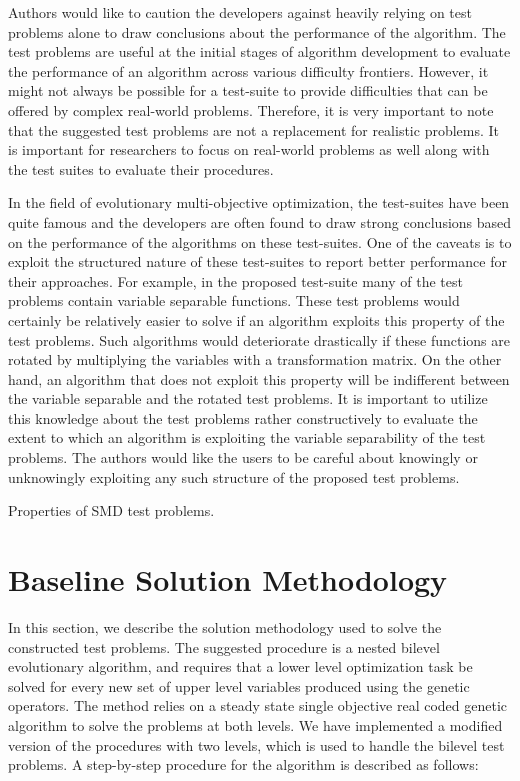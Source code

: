 \documentclass[twoside]{article}
\begin{document}
Authors would like to caution the developers against heavily relying on test problems alone to draw conclusions about the performance of the algorithm. The test problems are useful at the initial stages of algorithm development to evaluate the performance of an algorithm across various difficulty frontiers. 
However, it might not always be possible for a test-suite to provide difficulties that can be offered by complex real-world problems. Therefore, it is very important to note that the suggested test problems are not a replacement for realistic problems. It is important for researchers to focus on real-world problems as well along with the test suites to evaluate their procedures.

In the field of evolutionary multi-objective optimization, the test-suites have been quite famous and the developers are often found to draw strong conclusions based on the performance of the algorithms on these test-suites. One of the caveats is to exploit the structured nature of these test-suites to report better performance for their approaches. For example, in the proposed test-suite many of the test problems contain variable separable functions. These test problems would certainly be relatively easier to solve if an algorithm exploits this property of the test problems. Such algorithms would deteriorate drastically if these functions are rotated by multiplying the variables with a transformation matrix. On the other hand, an algorithm that does not exploit this property will be indifferent between the variable separable and the rotated test problems. It is important to utilize this knowledge about the test problems rather constructively to evaluate the extent to which an algorithm is exploiting the variable separability of the test problems. The authors would like the users to be careful about knowingly or unknowingly exploiting any such structure of the proposed test problems.

\begin{table*}[!ht]
\begin{center}
\vspace{0mm}
\caption{Properties of SMD test problems.} 
\label{tab:summary}
\vspace{0mm}
\end{center}
\end{table*}

\section{Baseline Solution Methodology}\label{sec:nested-algorithm}
In this section, we describe the solution methodology used to solve the constructed test problems. The suggested procedure is a nested bilevel evolutionary algorithm, and requires that a lower level optimization task be solved for every new set of upper level variables produced using the genetic operators. The method relies on a steady state single objective real coded genetic algorithm to solve the problems at both levels. We have implemented a modified version of the procedures \citep{my-cec05,my-cec06} with two levels, which is used to handle the bilevel test problems. 
A step-by-step procedure for the algorithm is described as follows:
\end{document}
